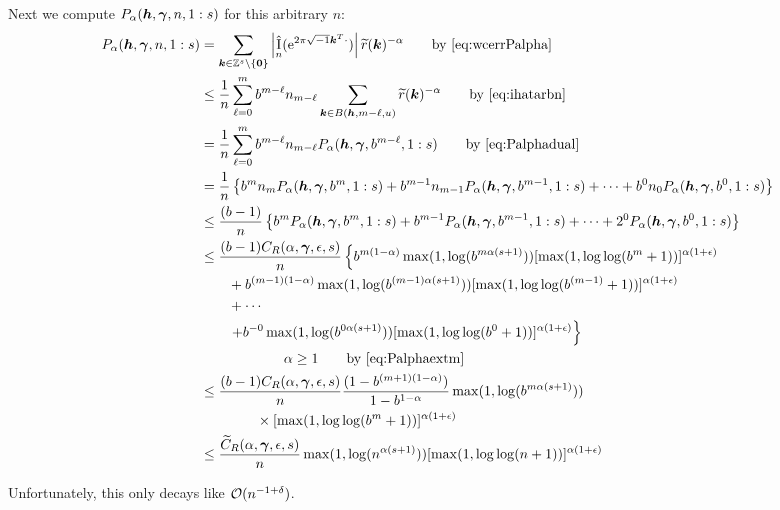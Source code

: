 \documentclass{amsart}
\newcommand{\tr}{\widetilde{r}}
\DeclareMathOperator{\appxint}{\hat{I}}
\begin{document}
Next we compute $P_\alpha(\boldsymbol{h},\boldsymbol{\gamma},n,1:s)$ for this arbitrary $n$:
\begin{align*}
      P_\alpha(\vh,\vgamma,n,1:s) & = \sum_{\vk \in \integers^s \setminus\{\vzero\}} \abs{\appxint_n(\me^{2 \pi \sqrt{-1} \vk^T \cdot})}\tr(\vk)^{-\alpha} \qquad \text{by \eqref{eq:wcerrPalpha}} \\
      & \le \frac {1}{n} \sum_{\ell = 0}^{m} b^{m-\ell} n_{m - \ell} \sum_{\vk \in B(\vh,m-\ell,u)} \tr(\vk)^{-\alpha}
      \qquad \text{by \eqref{eq:ihatarbn}}\\
      & = \frac {1}{n} \sum_{\ell = 0}^{m} b^{m-\ell} n_{m - \ell} P_\alpha(\vh,\vgamma,b^{m-\ell},1:s)
      \qquad \text{by \eqref{eq:Palphadual}}\\
      & =  \frac {1}{n} \left\{ b^m n_m P_\alpha(\vh,\vgamma,b^m,1:s) + b^{m-1} n_{m-1} P_\alpha(\vh,\vgamma,b^{m-1},1:s) + \cdots + b^0 n_0 P_\alpha(\vh,\vgamma,b^0,1:s)  \right\} \\
      &\le \frac {(b-1)}{n} \left\{ b^m  P_\alpha(\vh,\vgamma,b^m,1:s) + b^{m-1}  P_\alpha(\vh,\vgamma,b^{m-1},1:s) + \cdots + 2^0  P_\alpha(\vh,\vgamma,b^0,1:s)  \right\} \\
      & \le \frac {(b-1)C_{R}(\alpha,\vgamma,\epsilon,s)}{n} \left\{ b^{m(1-\alpha)}\max(1, \log(b^{m\alpha(s+1)})) [\max(1,\log \log (
    b^m+1))]^{\alpha(1+\epsilon)}\right .\\ 
      & \qquad  + b^{(m-1)(1-\alpha)}\max(1, \log(b^{(m-1)\alpha(s+1)})) [\max(1,\log \log (
    b^{(m-1)}+1))]^{\alpha(1+\epsilon)}\\
      & \qquad + \cdots \\
      & \qquad  \left . + b^{-0}\max(1, \log(b^{0\alpha(s+1)})) [\max(1,\log \log (
    b^{0}+1))]^{\alpha(1+\epsilon)} \right\}\\
      & \qquad \qquad \qquad \alpha \ge 1 \qquad \text{by \eqref{eq:Palphaextm}}\\
      & \le \frac {(b-1)C_{R}(\alpha,\vgamma,\epsilon,s)}{n} \frac{(1 - b^{(m+1)(1-\alpha)})}{1 - b^{1-\alpha}}
      \max(1, \log(b^{m\alpha(s+1)})) \\
      & \qquad \qquad \times [\max(1,\log \log (
    b^m+1))]^{\alpha(1+\epsilon)} \\
      & \le \frac {\widetilde{C}_{R}(\alpha,\vgamma,\epsilon,s)}{n}
      \max(1, \log(n^{\alpha(s+1)}))
      [\max(1,\log \log (
    n+1))]^{\alpha(1+\epsilon)}
\end{align*}

Unfortunately, this only decays like $\operatorname{{\mathcal O}}(n^{-1+\delta})$. \\
\end{document}
